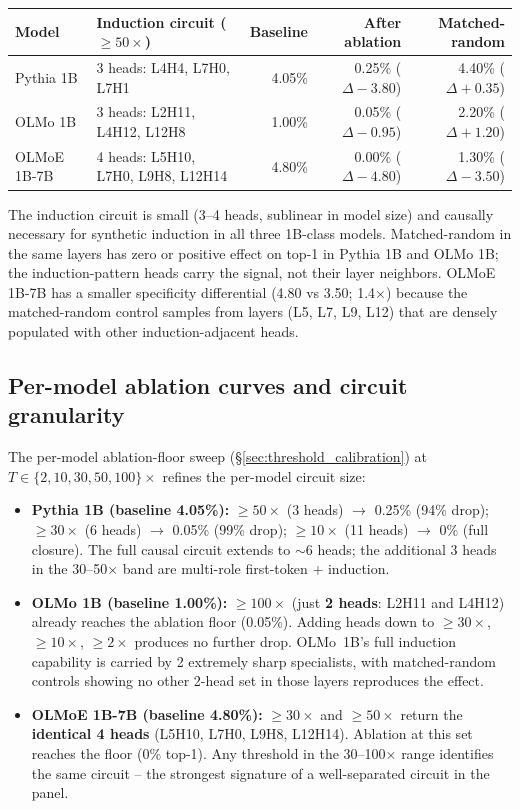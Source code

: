 \documentclass[11pt]{article}
\begin{document}
\begin{center}
\footnotesize
\begin{tabular}{llrrr}
\toprule
Model & Induction circuit ($\geq 50\times$) & Baseline & After ablation & Matched-random \\
\midrule
Pythia 1B   & 3 heads: L4H4, L7H0, L7H1 & 4.05\% & 0.25\% ($\Delta -3.80$) & 4.40\% ($\Delta +0.35$) \\
OLMo 1B     & 3 heads: L2H11, L4H12, L12H8 & 1.00\% & 0.05\% ($\Delta -0.95$) & 2.20\% ($\Delta +1.20$) \\
OLMoE 1B-7B & 4 heads: L5H10, L7H0, L9H8, L12H14 & 4.80\% & 0.00\% ($\Delta -4.80$) & 1.30\% ($\Delta -3.50$) \\
\bottomrule
\end{tabular}
\end{center}

The induction circuit is small (3--4 heads, sublinear in model size) and causally necessary for synthetic induction in all three 1B-class models. Matched-random in the same layers has zero or positive effect on top-1 in Pythia 1B and OLMo 1B; the induction-pattern heads carry the signal, not their layer neighbors. OLMoE 1B-7B has a smaller specificity differential (4.80 vs 3.50; 1.4$\times$) because the matched-random control samples from layers (L5, L7, L9, L12) that are densely populated with other induction-adjacent heads.

\subsection{Per-model ablation curves and circuit granularity}
\label{sec:per_model_ablation_curves}

The per-model ablation-floor sweep (\S\ref{sec:threshold_calibration}) at $T \in \{2, 10, 30, 50, 100\}\times$ refines the per-model circuit size:

\begin{itemize}[leftmargin=*,topsep=2pt,itemsep=2pt]
\item \textbf{Pythia 1B (baseline 4.05\%):} $\geq 50\times$ (3 heads) $\to$ 0.25\% (94\% drop); $\geq 30\times$ (6 heads) $\to$ 0.05\% (99\% drop); $\geq 10\times$ (11 heads) $\to$ 0\% (full closure). The full causal circuit extends to $\sim$6 heads; the additional 3 heads in the 30--50$\times$ band are multi-role first-token + induction.
\item \textbf{OLMo 1B (baseline 1.00\%):} $\geq 100\times$ (just \textbf{2 heads}: L2H11 and L4H12) already reaches the ablation floor (0.05\%). Adding heads down to $\geq 30\times$, $\geq 10\times$, $\geq 2\times$ produces no further drop. OLMo~1B's full induction capability is carried by 2 extremely sharp specialists, with matched-random controls showing no other 2-head set in those layers reproduces the effect.
\item \textbf{OLMoE 1B-7B (baseline 4.80\%):} $\geq 30\times$ and $\geq 50\times$ return the \textbf{identical 4 heads} (L5H10, L7H0, L9H8, L12H14). Ablation at this set reaches the floor (0\% top-1). Any threshold in the 30--100$\times$ range identifies the same circuit -- the strongest signature of a well-separated circuit in the panel.
\end{itemize}
\end{document}

